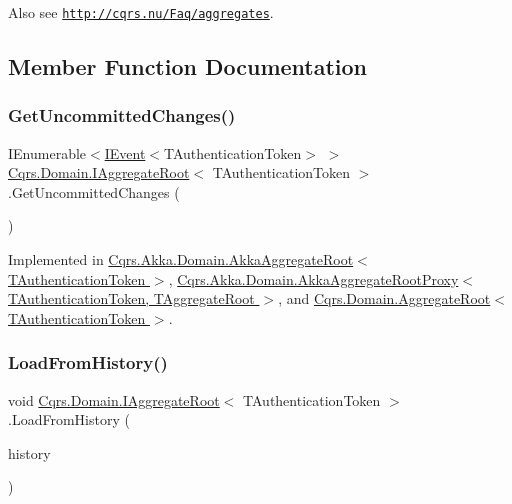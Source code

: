 Also see \href{http://cqrs.nu/Faq/aggregates}{\tt http\+://cqrs.\+nu/\+Faq/aggregates}. 

\subsection{Member Function Documentation}
\mbox{\label{interfaceCqrs_1_1Domain_1_1IAggregateRoot_a22fda414613f5ac0d4371554d7d6473b}} 
\subsubsection{\texorpdfstring{Get\+Uncommitted\+Changes()}{GetUncommittedChanges()}}
{\footnotesize\ttfamily I\+Enumerable$<$\hyperlink{interfaceCqrs_1_1Events_1_1IEvent}{I\+Event}$<$T\+Authentication\+Token$>$ $>$ \hyperlink{interfaceCqrs_1_1Domain_1_1IAggregateRoot}{Cqrs.\+Domain.\+I\+Aggregate\+Root}$<$ T\+Authentication\+Token $>$.Get\+Uncommitted\+Changes (\begin{DoxyParamCaption}{ }\end{DoxyParamCaption})}



Implemented in \hyperlink{classCqrs_1_1Akka_1_1Domain_1_1AkkaAggregateRoot_a2d11510fec0129ba318f63f7103aeec0}{Cqrs.\+Akka.\+Domain.\+Akka\+Aggregate\+Root$<$ T\+Authentication\+Token $>$}, \hyperlink{classCqrs_1_1Akka_1_1Domain_1_1AkkaAggregateRootProxy_afa620ced4762b0539da23ca063fed489}{Cqrs.\+Akka.\+Domain.\+Akka\+Aggregate\+Root\+Proxy$<$ T\+Authentication\+Token, T\+Aggregate\+Root $>$}, and \hyperlink{classCqrs_1_1Domain_1_1AggregateRoot_a625e885ec7885a686f729ed1efe3a8fa}{Cqrs.\+Domain.\+Aggregate\+Root$<$ T\+Authentication\+Token $>$}.

\mbox{\label{interfaceCqrs_1_1Domain_1_1IAggregateRoot_afe9329ee26ae68613059189ca64dfe60}} 
\subsubsection{\texorpdfstring{Load\+From\+History()}{LoadFromHistory()}}
{\footnotesize\ttfamily void \hyperlink{interfaceCqrs_1_1Domain_1_1IAggregateRoot}{Cqrs.\+Domain.\+I\+Aggregate\+Root}$<$ T\+Authentication\+Token $>$.Load\+From\+History (\begin{DoxyParamCaption}\item[{I\+Enumerable$<$ \hyperlink{interfaceCqrs_1_1Events_1_1IEvent}{I\+Event}$<$ T\+Authentication\+Token $>$$>$}]{history }\end{DoxyParamCaption})}



